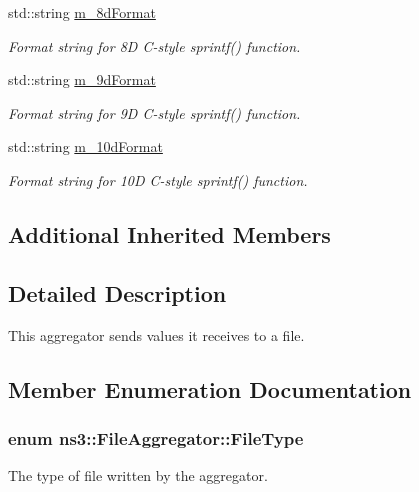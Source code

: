\begin{DoxyCompactItemize}
std\+::string \hyperlink{classns3_1_1FileAggregator_adb1cc33d1eff8d031a3debddba92b9a5}{m\+\_\+8d\+Format}
\begin{DoxyCompactList}\small\item\em Format string for 8D C-\/style sprintf() function. \end{DoxyCompactList}\item 
std\+::string \hyperlink{classns3_1_1FileAggregator_a8726cd1f40f4da37cdd544873b4ea583}{m\+\_\+9d\+Format}
\begin{DoxyCompactList}\small\item\em Format string for 9D C-\/style sprintf() function. \end{DoxyCompactList}\item 
std\+::string \hyperlink{classns3_1_1FileAggregator_a737006d5ab018c7f7d3b00bf85040015}{m\+\_\+10d\+Format}
\begin{DoxyCompactList}\small\item\em Format string for 10D C-\/style sprintf() function. \end{DoxyCompactList}\end{DoxyCompactItemize}
\subsection*{Additional Inherited Members}


\subsection{Detailed Description}
This aggregator sends values it receives to a file. 

\subsection{Member Enumeration Documentation}
\subsubsection[{\texorpdfstring{File\+Type}{FileType}}]{\setlength{\rightskip}{0pt plus 5cm}enum {\bf ns3\+::\+File\+Aggregator\+::\+File\+Type}}\hypertarget{classns3_1_1FileAggregator_aedb3108205a498f7ac0c564508067e2d}{}\label{classns3_1_1FileAggregator_aedb3108205a498f7ac0c564508067e2d}


The type of file written by the aggregator. 

